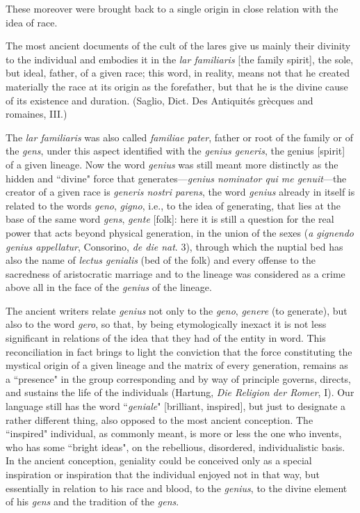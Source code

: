 These moreover were brought back to a single origin in close relation with the idea of race.

\begin{quotex}
The most ancient documents of the cult of the lares give us mainly their divinity to the individual and embodies it in the \emph{lar familiaris} [the family spirit], the sole, but ideal, father, of a given race; this word, in reality, means not that he created materially the race at its origin as the forefather, but that he is the divine cause of its existence and duration. (Saglio, Dict. Des Antiquités grècques and romaines, III.) 

\end{quotex}
The \emph{lar familiaris} was also called \emph{familiae pater}, father or root of the family or of the \emph{gens}, under this aspect identified with the \emph{genius generis}, the genius [spirit] of a given lineage. Now the word \emph{genius} was still meant more distinctly as the hidden and ``divine" force that generates—\emph{genius nominator qui me genuit}—the creator of a given race is \emph{generis nostri parens}, the word \emph{genius} already in itself is related to the words \emph{geno}, \emph{gigno}, i.e., to the idea of generating, that lies at the base of the same word \emph{gens}, \emph{gente} [folk]: here it is still a question for the real power that acts beyond physical generation, in the union of the sexes (\emph{a gignendo genius appellatur}, Consorino, \emph{de die nat}. 3), through which the nuptial bed has also the name of \emph{lectus genialis} (bed of the folk) and every offense to the sacredness of aristocratic marriage and to the lineage was considered as a crime above all in the face of the \emph{genius} of the lineage.

The ancient writers relate \emph{genius} not only to the \emph{geno}, \emph{genere} (to generate), but also to the word \emph{gero}, so that, by being etymologically inexact it is not less significant in relations of the idea that they had of the entity in word. This reconciliation in fact brings to light the conviction that the force constituting the mystical origin of a given lineage and the matrix of every generation, remains as a ``presence" in the group corresponding and by way of principle governs, directs, and sustains the life of the individuals (Hartung, \emph{Die Religion der Romer}, I). Our language still has the word ``\emph{geniale}" [brilliant, inspired], but just to designate a rather different thing, also opposed to the most ancient conception. The ``inspired" individual, as commonly meant, is more or less the one who invents, who has some ``bright ideas", on the rebellious, disordered, individualistic basis. In the ancient conception, geniality could be conceived only as a special inspiration or inspiration that the individual enjoyed not in that way, but essentially in relation to his race and blood, to the \emph{genius}, to the divine element of his \emph{gens} and the tradition of the \emph{gens}.



